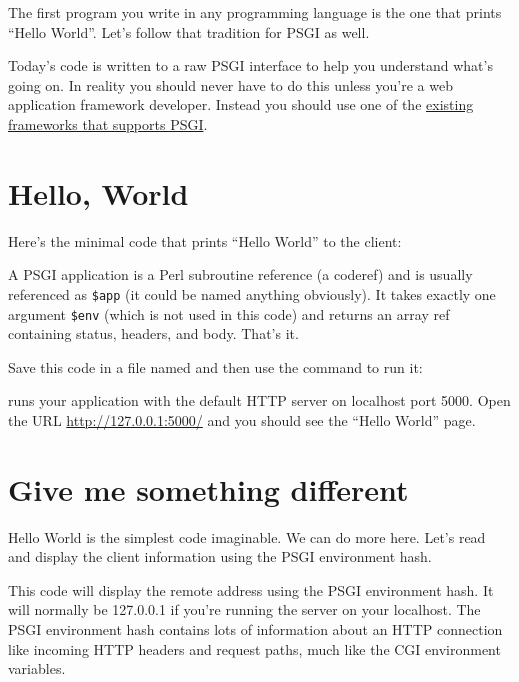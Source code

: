 The first program you write in any programming language is the one that
prints ``Hello World''. Let's follow that tradition for PSGI as well.

\begin{note}
  Today's code is written to a raw PSGI interface to help
you understand what's going on. In reality you should never have to do
this unless you're a web application framework developer. Instead you
should use one of the \href{http://plackperl.org/\#frameworks}{existing
frameworks that supports PSGI}.
\end{note}

\section{Hello, World}\label{hello-world}

Here's the minimal code that prints ``Hello World'' to the client:


A PSGI application is a Perl subroutine reference (a coderef) and is
usually referenced as \lstinline!$app! (it could be named anything
obviously). It takes exactly one argument \lstinline!$env! (which is not
used in this code) and returns an array ref containing status, headers,
and body. That's it.

Save this code in a file named  and then use the
 command to run it:


 runs your application with the default HTTP server
 on localhost port 5000. Open the URL
\url{http://127.0.0.1:5000/} and you should see the ``Hello World'' page.

\section{Give me something
different}\label{give-me-something-different}

Hello World is the simplest code imaginable. We can do more here. Let's
read and display the client information using the PSGI environment hash.


This code will display the remote address using the PSGI environment
hash. It will normally be 127.0.0.1 if you're running the server on your
localhost. The PSGI environment hash contains lots of information about
an HTTP connection like incoming HTTP headers and request paths, much
like the CGI environment variables.


